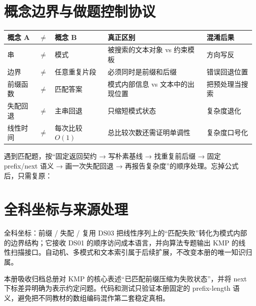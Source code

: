 \documentclass[UTF8,fontset=none,11pt,a4paper]{ctexart}
\begin{document}
\section{概念边界与做题控制协议}
\begin{center}\small
\begin{tabularx}{\linewidth}{L{1.9cm}C{0.35cm}L{1.9cm}YY}
\toprule
概念 A & $\neq$ & 概念 B & 真正区别 & 混淆后果\\
\midrule
串 & $\neq$ & 模式 & 被搜索的文本对象 vs 约束模板 & 方向写反\\
边界 & $\neq$ & 任意重复片段 & 必须同时是前缀和后缀 & 错误回退位置\\
前缀函数 & $\neq$ & 匹配答案 & 模式内部信息 vs 文本中的出现位置 & 把预处理当搜索\\
失配回退 & $\neq$ & 主串回退 & 只缩短模式状态 & 复杂度退化\\
线性时间 & $\neq$ & 每次比较 $O(1)$ & 总比较次数还需证明单调性 & 复杂度口号化\\
\bottomrule
\end{tabularx}
\end{center}

遇到匹配题，按“固定返回契约 → 写朴素基线 → 找重复前后缀 → 固定 prefix/next 语义 → 画一次失配回退 → 再报告复杂度”的顺序处理。忘掉公式后，只需复原：

\section{全科坐标与来源处理}
\begin{corebox}{全科坐标：前缀 / 失配 / 复用}
DS03 把线性序列上的“匹配失败”转化为模式内部的边界结构；它接收 DS01 的顺序访问成本语言，并向算法专题输出 KMP 的线性扫描接口。自动机、多模式和文本索引属于后续扩展，不改变本册的唯一知识归属。
\end{corebox}

本册吸收归档总册对 KMP 的核心表述“已匹配前缀压缩为失败状态”，并将 next 下标差异明确为表示约定问题。代码和测试只验证本册固定的 prefix-length 语义，避免把不同教材的数组编码混作第二套稳定真相。
\end{document}
